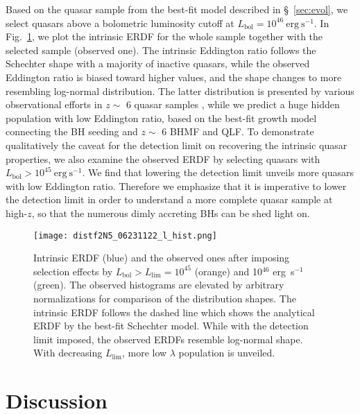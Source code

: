 \documentclass[nolinenumbers,preprint2,tighten]{aastex631}
\newcommand{\Lbol}{L_\mathrm{bol}}
\begin{document}
\begin{CJK*}{UTF8}{gbsn}
Based on the quasar sample from the best-fit model described in \S~\ref{sec:evol}, 
we select quasars above a bolometric luminosity cutoff at $\Lbol=10^{46}~\mathrm{erg~s^{-1}}$. 
In Fig.~\ref{fig:lhist}, we plot the intrinsic ERDF for the whole sample together with 
the selected sample (observed one). 
The intrinsic Eddington ratio follows the Schechter shape with a majority of inactive quasars, 
while the observed Eddington ratio is biased toward higher values, and the shape changes to 
more resembling log-normal distribution. 
The latter distribution is presented by various observational efforts in $z\sim$ 6 quasar samples
\citep[e.g.,][]{2010AJ....140..546W,2019ApJ...873...35S}, 
while we predict a huge hidden population with low Eddington ratio, 
based on the best-fit growth model connecting the BH seeding and $z\sim$ 6 BHMF and QLF. 
To demonstrate qualitatively the caveat for the detection limit on recovering the intrinsic quasar properties, 
we also examine the observed ERDF by selecting quasars with $\Lbol>10^{45}~\mathrm{erg~s^{-1}}$. 
We find that lowering the detection limit unveils more quasars with low Eddington ratio. 
Therefore we emphasize that it is imperative to lower the detection limit in order to 
understand a more complete quasar sample at high-$z$, 
so that the numerous dimly accreting BHs can be shed light on.



\begin{figure}
\centering
\texttt{[image: distf2N5\_06231122\_l\_hist.png]}
\caption{
Intrinsic ERDF (blue) and the observed ones after imposing selection effects by $\Lbol>L_\mathrm{lim}=10^{45}$ (orange) and 10$^{46}$ erg~s$^{-1}$ (green).
The observed histograms are elevated by arbitrary normalizations for comparison of the distribution shapes.
The intrinsic ERDF follows the dashed line which shows the analytical ERDF by the best-fit Schechter model. 
While with the detection limit imposed, the observed ERDFs resemble log-normal shape. 
With decreasing $L_\mathrm{lim}$, more low $\lambda$ population is unveiled.
}
\label{fig:lhist}
\end{figure}
  

\vspace{5mm}
\section{Discussion}\label{sec:discussion}



\end{CJK*}
\end{document}
